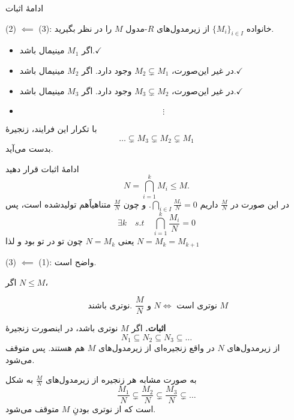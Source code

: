\begin{frame}{ادامهٔ اثبات}

    (2) $\impliedby$ (3):
    خانواده $\{M_i\}_{i\in I}$ از زیرمدول‌های $R$-مدول $M$ را در نظر بگیرید.
    \begin{tblock}{}
        \begin{itemize}
            \item [] اگر \(M_1\) مینیمال باشد.\(\checkmark\)
            \item [] در غیر این‌صورت، \(M_2 \subsetneq M_1\) وجود دارد. اگر \(M_2\) مینیمال باشد.\(\checkmark\)
            \item [] در غیر این‌صورت، \(M_3 \subsetneq M_2\) وجود دارد. اگر \(M_3\) مینیمال باشد.\(\checkmark\)
            \item [] \[\vdots\]
        \end{itemize}
    \end{tblock}

    با تکرار این فرایند،‌ زنجیرهٔ
    \[
        \dots  \subsetneq  M_3 \subsetneq M_2 \subsetneq M_1
    \]
    بدست می‌آید.

\end{frame}

\begin{frame}{ادامهٔ اثبات}
    قرار دهید
    \[
        N = \bigcap_{i=1}^k M_i \leqslant M.
    \]
    در این صورت در
    \(\frac{M}{N}\)
    داریم
    \(\bigcap_{i \in I} \frac{M_i}{N} = 0\).
    و چون
    \(\frac{M}{N}\)
    متناهیاًهم ‌تولیدشده است،‌ پس
    \[
        \exists k \quad s.t \quad \bigcap_{i = 1}^{k} \frac{M_i}{N} = 0
    \]
    یعنی
    \(N = M_k\)
    چون تو در تو بود و لذا
    \(N = M_k = M_{k+1}\)

    \bigskip
    (3) $\impliedby$ (1):
    واضح است.

\end{frame}


\begin{frame}
    \begin{theorem}
        اگر $N \leqslant M$،

        \[
            \text{ نوتری باشند.  } \frac{M}{N} \text{  و } N \iff  \text{ نوترى است  } M
        \]

    \end{theorem}
    \textbf{اثبات.}
    اگر
    \(M\)
    نوترى
    باشد،‌ در اینصورت زنجیرهٔ
    \[
        N_1 \subseteq N_2 \subseteq N_3 \subseteq \dots
    \]
    از زیرمدول‌های
    \(N\)
    در واقع زنجیره‌ای از زیرمدول‌های
    \(M\)
    هم هستند. پس متوقف می‌شود.

    به صورت مشابه هر زنجیره از زیرمدول‌های
    \(\frac{M}{N}\)
    به شکل
    \[
        \frac{M_1}{N} \subsetneq \frac{M_2}{N} \subsetneq \frac{M_3}{N} \subsetneq \dots
    \]
    است که از نوتری بودنِ
    \(M\)
    متوقف می‌شود.

\end{frame}


